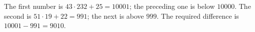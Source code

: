 The first number is $43\cdot232+25=10001$; the preceding one is below $10000$. The second is $51\cdot19+22=991$; the next is above $999$. The required difference is $10001-991=\boxed{9010}$.
